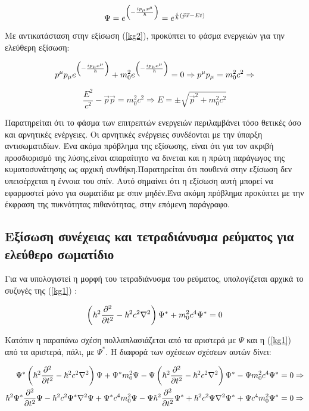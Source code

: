 \begin{equation}
  \Psi = e^{\left(  -\frac{ip_{\mu}x^{\mu}}{\hbar} \right)  } =e^{ \frac{i}{\hbar}\left(  \vec{p}\vec{x} -Et \right)  }
  \label{sol1}
\end{equation}

Με αντικατάσταση στην εξίσωση (\ref{kg2}), προκύπτει το φάσμα ενεργειών για την ελεύθερη εξίσωση:

\[
  {p}^\mu {p}_\mu e^{\left(  -\frac{ip_{\mu}x^{\mu}}{\hbar} \right)  } +m_0^2 e^{\left(  -\frac{ip_{\mu}x^{\mu}}{\hbar} \right)  } = 0 \Rightarrow {p}^\mu {p}_\mu = m_0^2 c^2 \Rightarrow
\]

\[
\frac{E^2}{c^2}- \vec{p}\vec{p}=m_0^2c^2 \Rightarrow E=\pm \sqrt{\vec{p}^2 + m_0^2c^2} 
\]

Παρατηρείται ότι το φάσμα των επιτρεπτών ενεργειών περιλαμβάνει τόσο θετικές όσο και αρνητικές ενέργειες. Οι αρνητικές ενέργειες συνδέονται με την ύπαρξη αντισωματιδίων. Ένα ακόμα πρόβλημα της εξίσωσης, είναι ότι για τον ακριβή προσδιορισμό της λύσης,είναι απαραίτητο να δινεται και η πρώτη παράγωγος της κυματοσυνάτησης ως αρχική συνθήκη.Παρατηρείται ότι πουθενά στην εξίσωση δεν υπεισέρχεται η έννοια του σπίν. Αυτό σημαίνει ότι η εξίσωση αυτή μπορεί να εφαρμοστεί μόνο για σωματίδια με σπιν μηδέν.Ένα ακόμη πρόβλημα προκύπτει με την έκφραση της πυκνότητας πιθανότητας, στην επόμενη παράγραφο.
\subsection{Εξίσωση συνέχειας και τετραδιάνυσμα ρεύματος για ελεύθερο σωματίδιο}  

Για να υπολογιστεί η μορφή του τετραδιάνυσμα του ρεύματος, υπολογίζεται αρχικά το συζυγές της (\ref{kg1}) :

\[
\left(  \hbar^2 \frac{\partial ^2}{\partial t^2}- \hbar^2 c^2 \nabla^2 \right)  \Psi^* +m_0^2 c^4 \Psi^* = 0
\]

Κατόπιν η παραπάνω σχέση πολλαπλασιάζεται από τα αριστερά με $\Psi$ και η (\ref{kg1}) από τα αριστερά, πάλι, με $\Psi^*$. Η διαφορά των σχέσεων σχέσεων αυτών δίνει: 

\begin{align*}
  \Psi^* \left(   \hbar^2 \frac{\partial ^2}{\partial t^2}- \hbar^2 c^2 \nabla^2 \right)  \Psi +\Psi^* m_0^2 \Psi - \Psi \left(  \hbar^2\frac{\partial ^2}{\partial t^2}- \hbar^2 c^2 \nabla^2 \right)  \Psi^* -\Psi m_0^2 c^4 \Psi^* &= 0 \Rightarrow
  \\ \hbar^2\Psi^* \frac{\partial ^2}{\partial t^2} \Psi - \hbar^2 c^2\Psi^* \nabla^2\Psi +\Psi^* c^4 m_0^2 \Psi - \Psi \hbar^2\frac{\partial ^2}{\partial t^2}\Psi^* + \hbar^2 c^2 \Psi \nabla^2 \Psi^* + \Psi c^4  m_0^2 \Psi^* &= 0 \Rightarrow
\end{align*}

